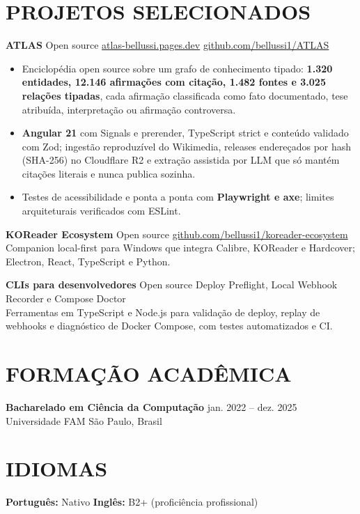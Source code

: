 ﻿\documentclass[10pt,a4paper]{article}
\begin{document}
\section*{PROJETOS SELECIONADOS}

\textbf{ATLAS} \textbar{} Open source \textbar{} \href{https://atlas-bellussi.pages.dev/}{atlas-bellussi.pages.dev} \textbar{} \href{https://github.com/bellussi1/ATLAS}{github.com/bellussi1/ATLAS}
\begin{itemize}
  \item Enciclop\'edia open source sobre um grafo de conhecimento tipado: \textbf{1.320 entidades, 12.146 afirma\c{c}\~oes com cita\c{c}\~ao, 1.482 fontes e 3.025 rela\c{c}\~oes tipadas}, cada afirma\c{c}\~ao classificada como fato documentado, tese atribu\'ida, interpreta\c{c}\~ao ou afirma\c{c}\~ao controversa.
  \item \textbf{Angular 21} com Signals e prerender, TypeScript strict e conte\'udo validado com Zod; ingest\~ao reproduz\'ivel do Wikimedia, releases endere\c{c}ados por hash (SHA-256) no Cloudflare R2 e extra\c{c}\~ao assistida por LLM que s\'o mant\'em cita\c{c}\~oes literais e nunca publica sozinha.
  \item Testes de acessibilidade e ponta a ponta com \textbf{Playwright e axe}; limites arquiteturais verificados com ESLint.
\end{itemize}

\textbf{KOReader Ecosystem} \textbar{} Open source \textbar{} \href{https://github.com/bellussi1/koreader-ecosystem}{github.com/bellussi1/koreader-ecosystem}\\
Companion local-first para Windows que integra Calibre, KOReader e Hardcover; Electron, React, TypeScript e Python.

\textbf{CLIs para desenvolvedores} \textbar{} Open source \textbar{} Deploy Preflight, Local Webhook Recorder e Compose Doctor\\
Ferramentas em TypeScript e Node.js para valida\c{c}\~ao de deploy, replay de webhooks e diagn\'ostico de Docker Compose, com testes automatizados e CI.

\section*{FORMA\c{C}\~AO ACAD\^EMICA}
\textbf{Bacharelado em Ci\^encia da Computa\c{c}\~ao} \hfill jan. 2022 -- dez. 2025\\
Universidade FAM \hfill S\~ao Paulo, Brasil

\section*{IDIOMAS}
\textbf{Portugu\^es:} Nativo \hfill \textbf{Ingl\^es:} B2+ (profici\^encia profissional)
\end{document}
